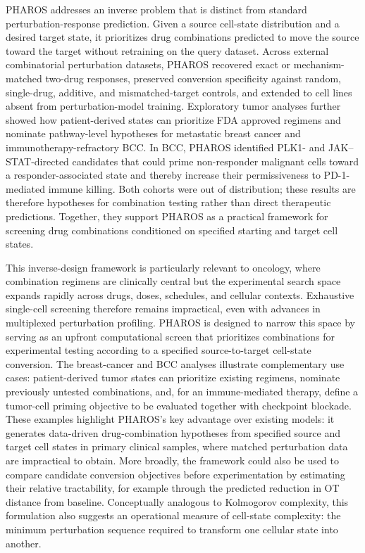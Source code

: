 \documentclass[11pt,a4paper]{article}
\begin{document}
PHAROS addresses an inverse problem that is distinct from standard perturbation-response prediction. Given a source cell-state distribution and a desired target state, it prioritizes drug combinations predicted to move the source toward the target without retraining on the query dataset. Across external combinatorial perturbation datasets, PHAROS recovered exact or mechanism-matched two-drug responses, preserved conversion specificity against random, single-drug, additive, and mismatched-target controls, and extended to cell lines absent from perturbation-model training. Exploratory tumor analyses further showed how patient-derived states can prioritize FDA approved regimens and nominate pathway-level hypotheses for metastatic breast cancer and immunotherapy-refractory BCC. In BCC, PHAROS identified PLK1- and JAK--STAT-directed candidates that could prime non-responder malignant cells toward a responder-associated state and thereby increase their permissiveness to PD-1-mediated immune killing. Both cohorts were out of distribution; these results are therefore hypotheses for combination testing rather than direct therapeutic predictions. Together, they support PHAROS as a practical framework for screening drug combinations conditioned on specified starting and target cell states.

This inverse-design framework is particularly relevant to oncology, where combination regimens are clinically central but the experimental search space expands rapidly across drugs, doses, schedules, and cellular contexts. Exhaustive single-cell screening therefore remains impractical, even with advances in multiplexed perturbation profiling\cite{Lotfollahi2023, McFaline-Figueroa2024, Srivatsan2020, Peidli2024}. PHAROS is designed to narrow this space by serving as an upfront computational screen that prioritizes combinations for experimental testing according to a specified source-to-target cell-state conversion. The breast-cancer and BCC analyses illustrate complementary use cases: patient-derived tumor states can prioritize existing regimens, nominate previously untested combinations, and, for an immune-mediated therapy, define a tumor-cell priming objective to be evaluated together with checkpoint blockade. These examples highlight PHAROS’s key advantage over existing models: it generates data-driven drug-combination hypotheses from specified source and target cell states in primary clinical samples, where matched perturbation data are impractical to obtain. More broadly, the framework could also be used to compare candidate conversion objectives before experimentation by estimating their relative tractability, for example through the predicted reduction in OT distance from baseline. Conceptually analogous to Kolmogorov complexity, this formulation also suggests an operational measure of cell-state complexity: the minimum perturbation sequence required to transform one cellular state into another.
\end{document}
